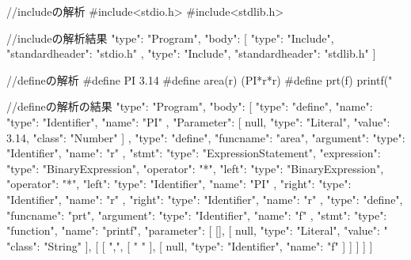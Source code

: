 //includeの解析
#include<stdio.h>
#include<stdlib.h>

//includeの解析結果
{
   "type": "Program",
   "body": [
      {
         "type": "Include",
         "standardheader": "stdio.h"
      },
      {
         "type": "Include",
         "standardheader": "stdlib.h"
      }
   ]
}

//defineの解析
#define PI 3.14
#define area(r) (PI*r*r)
#define prt(f) printf("%

//defineの解析の結果
{
   "type": "Program",
   "body": [
      {
         "type": "define",
         "name": {
            "type": "Identifier",
            "name": "PI"
         },
         "Parameter": [
            null,
            {
               "type": "Literal",
               "value": 3.14,
               "class": "Number"
            }
         ]
      },
      {
         "type": "define",
         "funcname": "area",
         "argument": {
            "type": "Identifier",
            "name": "r"
         },
         "stmt": {
            "type": "ExpressionStatement",
            "expression": {
               "type": "BinaryExpression",
               "operator": "*",
               "left": {
                  "type": "BinaryExpression",
                  "operator": "*",
                  "left": {
                     "type": "Identifier",
                     "name": "PI"
                  },
                  "right": {
                     "type": "Identifier",
                     "name": "r"
                  }
               },
               "right": {
                  "type": "Identifier",
                  "name": "r"
               }
            }
         }
      },
      {
         "type": "define",
         "funcname": "prt",
         "argument": {
            "type": "Identifier",
            "name": "f"
         },
         "stmt": {
            "type": "function",
            "name": "printf",
            "parameter": [
               [],
               [
                  null,
                  {
                     "type": "Literal",
                     "value": "%
                     "class": "String"
                  }
               ],
               [
                  [
                     ",",
                     [
                        " "
                     ],
                     [
                        null,
                        {
                           "type": "Identifier",
                           "name": "f"
                        }
                     ]
                  ]
               ]
            ]
         }
      }
   ]
}

